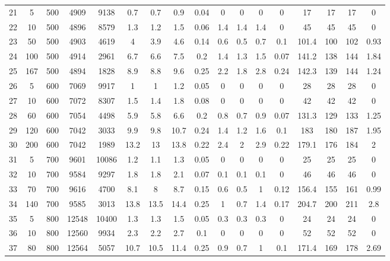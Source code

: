 \documentclass[11pt]{article}
\begin{document}
\begin{appendices}
\begin{landscape}
\begin{longtable}[c]{ccccc|cccc|cccc|cccc}
				21 & 5 & 500 & 4909 & 9138 & 0.7 & 0.7 & 0.9 & 0.04 & 0 & 0 & 0 & 0 & 17 & 17 & 17 & 0 \\
				\rowcolor[HTML]{EFEFEF} 
				22 & 10 & 500 & 4896 & 8579 & 1.3 & 1.2 & 1.5 & 0.06 & 1.4 & 1.4 & 1.4 & 0 & 45 & 45 & 45 & 0 \\
				\rowcolor[HTML]{EFEFEF} 
				23 & 50 & 500 & 4903 & 4619 & 4 & 3.9 & 4.6 & 0.14 & 0.6 & 0.5 & 0.7 & 0.1 & 101.4 & 100 & 102 & 0.93 \\
				\rowcolor[HTML]{EFEFEF} 
				24 & 100 & 500 & 4914 & 2961 & 6.7 & 6.6 & 7.5 & 0.2 & 1.4 & 1.3 & 1.5 & 0.07 & 141.2 & 138 & 144 & 1.84 \\
				\rowcolor[HTML]{EFEFEF} 
				25 & 167 & 500 & 4894 & 1828 & 8.9 & 8.8 & 9.6 & 0.25 & 2.2 & 1.8 & 2.8 & 0.24 & 142.3 & 139 & 144 & 1.24 \\
				26 & 5 & 600 & 7069 & 9917 & 1 & 1 & 1.2 & 0.05 & 0 & 0 & 0 & 0 & 28 & 28 & 28 & 0 \\
				27 & 10 & 600 & 7072 & 8307 & 1.5 & 1.4 & 1.8 & 0.08 & 0 & 0 & 0 & 0 & 42 & 42 & 42 & 0 \\
				28 & 60 & 600 & 7054 & 4498 & 5.9 & 5.8 & 6.6 & 0.2 & 0.8 & 0.7 & 0.9 & 0.07 & 131.3 & 129 & 133 & 1.25 \\
				29 & 120 & 600 & 7042 & 3033 & 9.9 & 9.8 & 10.7 & 0.24 & 1.4 & 1.2 & 1.6 & 0.1 & 183 & 180 & 187 & 1.95 \\
				30 & 200 & 600 & 7042 & 1989 & 13.2 & 13 & 13.8 & 0.22 & 2.4 & 2 & 2.9 & 0.22 & 179.1 & 176 & 184 & 2 \\
				\rowcolor[HTML]{EFEFEF} 
				31 & 5 & 700 & 9601 & 10086 & 1.2 & 1.1 & 1.3 & 0.05 & 0 & 0 & 0 & 0 & 25 & 25 & 25 & 0 \\
				\rowcolor[HTML]{EFEFEF} 
				32 & 10 & 700 & 9584 & 9297 & 1.8 & 1.8 & 2.1 & 0.07 & 0.1 & 0.1 & 0.1 & 0 & 46 & 46 & 46 & 0 \\
				\rowcolor[HTML]{EFEFEF} 
				33 & 70 & 700 & 9616 & 4700 & 8.1 & 8 & 8.7 & 0.15 & 0.6 & 0.5 & 1 & 0.12 & 156.4 & 155 & 161 & 0.99 \\
				\rowcolor[HTML]{EFEFEF} 
				34 & 140 & 700 & 9585 & 3013 & 13.8 & 13.5 & 14.4 & 0.25 & 1 & 0.7 & 1.4 & 0.17 & 204.7 & 200 & 211 & 2.8 \\
				35 & 5 & 800 & 12548 & 10400 & 1.3 & 1.3 & 1.5 & 0.05 & 0.3 & 0.3 & 0.3 & 0 & 24 & 24 & 24 & 0 \\
				36 & 10 & 800 & 12560 & 9934 & 2.3 & 2.2 & 2.7 & 0.1 & 0 & 0 & 0 & 0 & 52 & 52 & 52 & 0 \\
				37 & 80 & 800 & 12564 & 5057 & 10.7 & 10.5 & 11.4 & 0.25 & 0.9 & 0.7 & 1 & 0.1 & 171.4 & 169 & 178 & 2.69 \\

\end{longtable}
\end{landscape}
\end{appendices}
\end{document}
